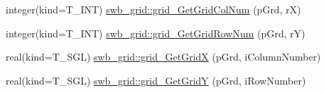 \begin{DoxyCompactItemize}
\item 
integer(kind=T\_\-INT) \hyperlink{namespaceswb__grid_abc60ec733d1036ed680463fa0a715a42}{swb\_\-grid::grid\_\-GetGridColNum} (pGrd, rX)
\item 
integer(kind=T\_\-INT) \hyperlink{namespaceswb__grid_a9f6375304d1f9e43d3f7ea2bf27be2be}{swb\_\-grid::grid\_\-GetGridRowNum} (pGrd, rY)
\item 
real(kind=T\_\-SGL) \hyperlink{namespaceswb__grid_a57f66bc3cc5e053d864091aef6bd9c49}{swb\_\-grid::grid\_\-GetGridX} (pGrd, iColumnNumber)
\item 
real(kind=T\_\-SGL) \hyperlink{namespaceswb__grid_ae3fe72b5a4b950efc0537af934518bd0}{swb\_\-grid::grid\_\-GetGridY} (pGrd, iRowNumber)
\end{DoxyCompactItemize}
